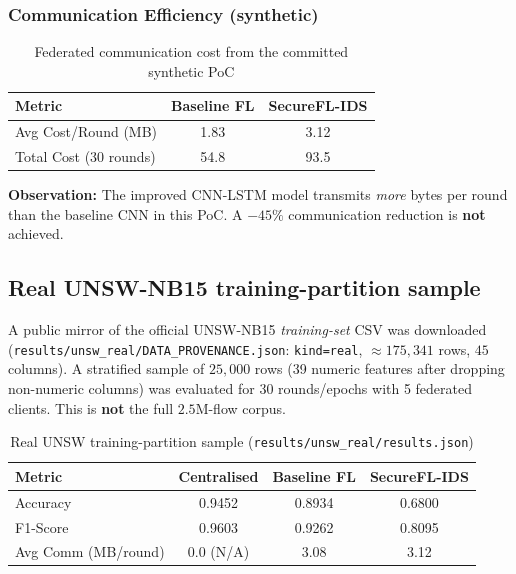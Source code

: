 \subsubsection{Communication Efficiency (synthetic)}

\begin{table}[h]
\centering
\begin{tabular}{lcc}
\toprule
\textbf{Metric} & \textbf{Baseline FL} & \textbf{SecureFL-IDS} \\
\midrule
Avg Cost/Round (MB) & 1.83 & 3.12 \\
Total Cost (30 rounds) & 54.8 & 93.5 \\
\bottomrule
\end{tabular}
\caption{Federated communication cost from the committed synthetic PoC}
\label{tab:communication_results}
\end{table}

\textbf{Observation:} The improved CNN-LSTM model transmits \emph{more} bytes per round than the baseline CNN in this PoC. A $-45\%$ communication reduction is \textbf{not} achieved.

\subsection{Real UNSW-NB15 training-partition sample}

A public mirror of the official UNSW-NB15 \emph{training-set} CSV was downloaded (\texttt{results/unsw\_real/DATA\_PROVENANCE.json}: \texttt{kind=real}, $\approx 175{,}341$ rows, $45$ columns). A stratified sample of $25{,}000$ rows (39 numeric features after dropping non-numeric columns) was evaluated for 30 rounds/epochs with 5 federated clients. This is \textbf{not} the full $2.5$M-flow corpus.

\begin{table}[h]
\centering
\begin{tabular}{lccc}
\toprule
\textbf{Metric} & \textbf{Centralised} & \textbf{Baseline FL} & \textbf{SecureFL-IDS} \\
\midrule
Accuracy & 0.9452 & 0.8934 & 0.6800 \\
F1-Score & 0.9603 & 0.9262 & 0.8095 \\
Avg Comm (MB/round) & 0.0 (N/A) & 3.08 & 3.12 \\
\bottomrule
\end{tabular}
\caption{Real UNSW training-partition sample (\texttt{results/unsw\_real/results.json})}
\label{tab:unsw_real_results}
\end{table}

